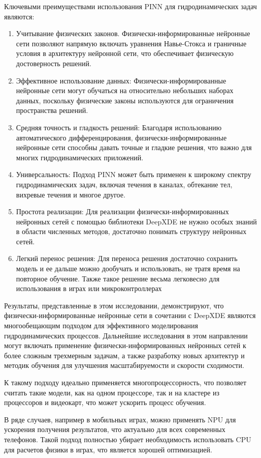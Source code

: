 Ключевыми преимуществами использования PINN для гидродинамических задач являются:
\begin{enumerate}
    \item Учитывание физических законов.
    Физически-информированные нейронные сети позволяют напрямую включать уравнения Навье-Стокса и граничные условия в архитектуру нейронной сети, что обеспечивает физическую достоверность решений.
    \item Эффективное использование данных: 
    Физически-информированные нейронные сети могут обучаться на относительно небольших наборах данных, поскольку физические законы используются для ограничения пространства решений.
    \item Средняя точность и гладкость решений: 
    Благодаря использованию автоматического дифференцирования, физически-информированные нейронные сети способны давать точные и гладкие решения, что важно для многих гидродинамических приложений.
    \item Универсальность: 
    Подход PINN может быть применен к широкому спектру гидродинамических задач, включая течения в каналах, обтекание тел, вихревые течения и многое другое.
    \item Простота реализации:
    Для реализации физически-информированных нейронных сетей с помощью библиотеки DeepXDE не нужно особых знаний в области численных методов, достаточно понимать структуру нейронных сетей.
    \item Легкий перенос решения:
    Для переноса решения достаточно сохранить модель и ее дальше можно дообучать и использовать, не тратя время на повторное обучение. Также такое решение весьма легковесно для использования
    в играх или микроконтроллерах
\end{enumerate}
Результаты, представленные в этом исследовании, демонстрируют, что физически-информированные нейронные сети в сочетании с DeepXDE являются многообещающим подходом для эффективного
моделирования гидродинамических процессов. Дальнейшие исследования в этом направлении могут включать применение физически-информированных нейронных сетей к более сложным трехмерным задачам,
а также разработку новых архитектур и методик обучения для улучшения масштабируемости и скорости сходимости.

К такому подходу идеально применяется многопроцессорность, что позволяет считать такие модели, как на одном процессоре, так и на кластере из процессоров и видеокарт, что может ускорить 
процесс обучения.

В ряде случаев, например в мобильных играх, можно применять NPU для ускорения получения результатов, что актуально для всех современных телефонов. Такой подход полностью убирает
необходимость использовать CPU для расчетов физики в играх, что является хорошей оптимизацией. 